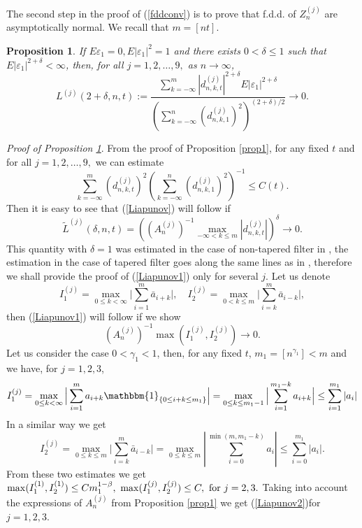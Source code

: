\documentclass[12pt]{article}
\def\b{\beta}
\def\d{\delta}
\def\e{\varepsilon}
\def\g{\gamma}
\newcommand{\ind}[1]{\mathbbm{1}_{#1}}
\theoremstyle{plain}
\newtheorem{prop}[teo]{Proposition}
\theoremstyle{definition}
\begin{document}
The second step in the proof of (\ref{fddconv}) is to prove that f.d.d. of $Z_n^{(j)}$ are asymptotically normal.
We recall that $m=[nt]$.
\begin{prop}\label{prop2} If $E\e_1=0, E|\e_1|^{2}=1$ and there exists $0<\d\le 1$ such that $E|\e_1|^{2+\d}<\infty$, then, for all $j=1, 2, \dots, 9,$ as $n\to \infty$,
\begin{equation}\label{Liapunov}
L^{(j)}(2+\d,n, t):=\frac{\sum_{k=-\infty}^m |d_{n,k,t}^{(j)}|^{2+\d}E|\e_1|^{2+\d}}{\left (\sum_{k=-\infty}^n (d_{n,k,1}^{(j)})^2\right )^{(2+\d)/2}} \to 0.
\end{equation}
\end{prop}
{\it Proof of Proposition \ref{prop2}}. From the proof of Proposition \ref{prop1}, for any fixed $t$ and for all $j=1, 2, \dots, 9,$ we can estimate
\begin{equation}\label{LiapunovA}
\sum_{k=-\infty}^m (d_{n,k,t}^{(j)})^2\left (\sum_{k=-\infty}^n (d_{n,k,1}^{(j)})^2\right )^{-1}\le C(t).
\end{equation}
Then it is easy to see that (\ref{Liapunov}) will follow if
\begin{equation}\label{Liapunov1}
{\tilde L}^{(j)}(\d,n, t)=\left ((A_n^{(j)})^{-1}\max_{-\infty<k\le m} |d_{n,k,t}^{(j)}|\right )^{\d} \to 0.
\end{equation}
This quantity with $\d=1$ was estimated in the case of non-tapered filter in \cite{Paul21}, the estimation in the case of tapered filter goes along the same lines as in \cite{Paul21}, therefore we shall provide the proof of (\ref{Liapunov1}) only for several $j$. Let us denote
\begin{equation}\label{Liapunov1A}
I_1^{(j)}=\max_{0\le k <\infty}\big |\sum_{i=1}^{m}{\bar a}_{i+k}\big |, \quad I_2^{(j)}=\max_{0<k\le m}\big |\sum_{i=k}^{m}{\bar a}_{i-k}\big |,
\end{equation}
then (\ref{Liapunov1}) will follow if we show
\begin{equation}\label{Liapunov2}
\left (A_n^{(j)} \right )^{-1}\max (I_1^{(j)}, I_2^{(j)}) \to 0.
\end{equation}
Let us consider the case $0<\g_1<1$, then, for any fixed $t$, $m_1=[n^{\g_1}]< m$ and we have, for $j=1, 2, 3$,
$$
I_1^{(j)}=\max_{0\le k <\infty}\Big |\sum_{i=1}^{m}a_{i+k} \ind{\{0\le i+k \leq m_1\}}\Big |=\max_{0\le k \le m_1-1}\Big |\sum_{i=1}^{ m_1-k}a_{i+k}\Big |\le \sum_{i=1}^{m_1}|a_{i}|
$$
In a similar way we get
$$
I_2^{(j)}=\max_{0\le k \le m}\big |\sum_{i=k}^{m}{\bar a}_{i-k}\big |=\max_{0\le k \le m}|\sum_{i=0}^{\min(m, m_1-k)}a_{i}|\le \sum_{i=0}^{ m_1}|a_{i}|.
$$
From these two estimates we get
$\max (I_1^{(1)}, I_2^{(1)})\le C m_1^{1-\b} , \ \max (I_1^{(j)}, I_2^{(j)})\le C, \ {\rm for} \ j=2, 3.$
Taking into account the expressions of $A_n^{(j)} $ from Proposition \ref{prop1} we get (\ref{Liapunov2})for $j=1, 2, 3.$
\end{document}
